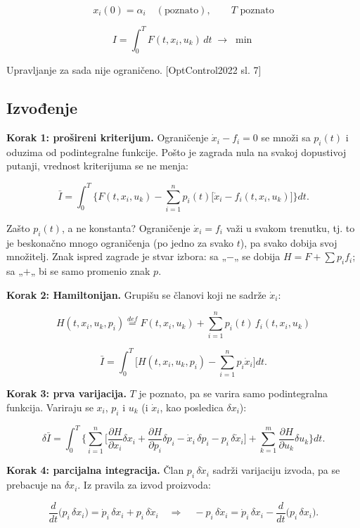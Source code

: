 \documentclass[11pt,a4paper,parskip=half,headsepline,numbers=noenddot]{scrartcl}
\DeclareRobustCommand{\izvor}[1]{{\small\color{izvorC}[#1]}}
\begin{document}
\[x_i(0) = \alpha_i \quad (\text{poznato}), \qquad T \text{ poznato}\]

\[I = \int_0^T F(t, x_i, u_k)\,dt \;\to\; \min\]

Upravljanje za sada nije ograničeno. \izvor{OptControl2022 sl. 7}

\subsection{Izvođenje}

\textbf{Korak 1: prošireni kriterijum.} Ograničenje \(\dot x_i - f_i = 0\) se množi sa \(p_i(t)\) i oduzima od podintegralne funkcije. Pošto je zagrada nula na svakoj dopustivoj putanji, vrednost kriterijuma se ne menja:

\[\bar I = \int_0^T \Big\{ F(t, x_i, u_k) - \sum_{i=1}^n p_i(t)\big[\dot x_i - f_i(t, x_i, u_k)\big] \Big\} dt .\]

\begin{zasto}
Zašto \(p_i(t)\), a ne konstanta? Ograničenje \(\dot x_i = f_i\) važi u svakom trenutku, tj. to je beskonačno mnogo ograničenja (po jedno za svako \(t\)), pa svako dobija svoj množitelj. Znak ispred zagrade je stvar izbora: sa „\(-\)„ se dobija \(H = F + \sum p_i f_i\); sa „\(+\)„ bi se samo promenio znak \(p\).
\end{zasto}

\textbf{Korak 2: Hamiltonijan.} Grupišu se članovi koji ne sadrže \(\dot x_i\):

\[H(t, x_i, u_k, p_i) \overset{def}{=} F(t, x_i, u_k) + \sum_{i=1}^n p_i(t)\, f_i(t, x_i, u_k)\]

\[\bar I = \int_0^T \Big[ H(t, x_i, u_k, p_i) - \sum_{i=1}^n p_i \dot x_i \Big] dt .\]

\textbf{Korak 3: prva varijacija.} \(T\) je poznato, pa se varira samo podintegralna funkcija. Variraju se \(x_i\), \(p_i\) i \(u_k\) (i \(\dot x_i\), kao posledica \(\delta x_i\)):

\[\delta \bar I = \int_0^T \Big\{ \sum_{i=1}^n \Big[ \frac{\partial H}{\partial x_i}\delta x_i + \frac{\partial H}{\partial p_i}\delta p_i - \dot x_i\,\delta p_i - p_i\,\delta \dot x_i \Big] + \sum_{k=1}^m \frac{\partial H}{\partial u_k}\delta u_k \Big\} dt .\]

\textbf{Korak 4: parcijalna integracija.} Član \(p_i\,\delta\dot x_i\) sadrži varijaciju izvoda, pa se prebacuje na \(\delta x_i\). Iz pravila za izvod proizvoda:

\[\frac{d}{dt}\big(p_i\,\delta x_i\big) = \dot p_i\,\delta x_i + p_i\,\delta\dot x_i \quad\Rightarrow\quad -p_i\,\delta\dot x_i = \dot p_i\,\delta x_i - \frac{d}{dt}\big(p_i\,\delta x_i\big) .\]
\end{document}
